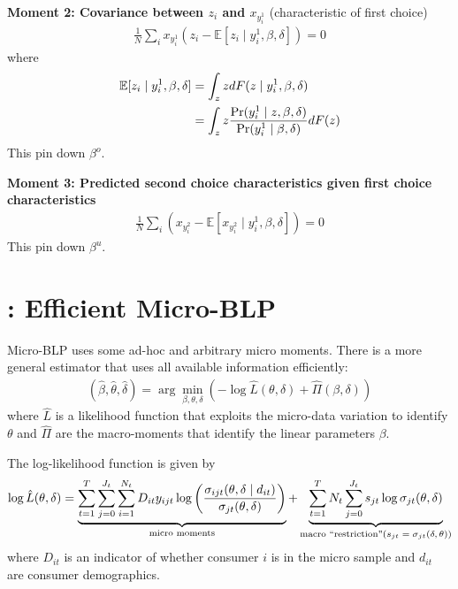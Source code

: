 \documentclass[11pt]{elegantbook}
\begin{document}
\textbf{Moment 2: Covariance between $z_i$ and $x_{y_i^1}$} (characteristic of first choice)
\begin{equation}
    \begin{aligned}
        \frac{1}{N}\sum_{i}x_{y_i^1}(z_i-\mathbb{E}[z_i\mid y_i^1,\beta,\delta])=0
    \end{aligned}
    \nonumber
\end{equation}
where
\begin{equation}
    \begin{aligned}
        \mathbb{E}[z_i\mid y_i^1,\beta,\delta]&=\int_z z d F(z\mid y_i^1,\beta,\delta)\\
        &=\int_z z \frac{\textnormal{Pr}(y_i^1\mid z,\beta,\delta)}{\textnormal{Pr}(y_i^1\mid \beta,\delta)} d F(z)
    \end{aligned}
    \nonumber
\end{equation}
This pin down $\beta^o$.

\textbf{Moment 3: Predicted second choice characteristics given first choice characteristics}
\begin{equation}
    \begin{aligned}
        \frac{1}{N}\sum_{i}\left(x_{y_i^2}-\mathbb{E}[x_{y_i^2}\mid y_i^1,\beta,\delta]\right)=0
    \end{aligned}
    \nonumber
\end{equation}
This pin down $\beta^u$.


\section{\cite{grieco2022conformant}: Efficient Micro-BLP}
Micro-BLP uses some ad-hoc and arbitrary micro moments. There is a more general estimator that uses all available information efficiently:
\begin{equation}
    \begin{aligned}
        \left(\hat{\beta},\hat{\theta},\hat{\delta}\right)=\arg\min_{\beta,\theta,\delta}\left(-\log\hat{L}(\theta,\delta)+\hat{\Pi}(\beta,\delta)\right)
    \end{aligned}
    \nonumber
\end{equation}
where $\hat{L}$ is a likelihood function that exploits the micro-data variation to identify $\theta$ and $\hat{\Pi}$ are the macro-moments that identify the linear parameters $\beta$.

The log-likelihood function is given by
\begin{equation}
    \begin{aligned}
        \log\hat{L}(\theta,\delta)=\underbrace{\sum_{t=1}^T\sum_{j=0}^{J_t}\sum_{i=1}^{N_t}D_{it}y_{ijt}\log\left(\frac{\sigma_{ijt}(\theta,\delta\mid d_{it})}{\sigma_{jt}(\theta,\delta)}\right)}_\textnormal{micro moments}+\underbrace{\sum_{t=1}^T N_t \sum_{j=0}^{J_t} s_{jt}\log\sigma_{jt}(\theta,\delta)}_\textnormal{macro ``restriction''($s_{jt}=\sigma_{jt}(\delta,\theta)$)}
    \end{aligned}
    \nonumber
\end{equation}
where $D_{it}$ is an indicator of whether consumer $i$ is in the micro sample and $d_{it}$ are consumer demographics.
\end{document}
